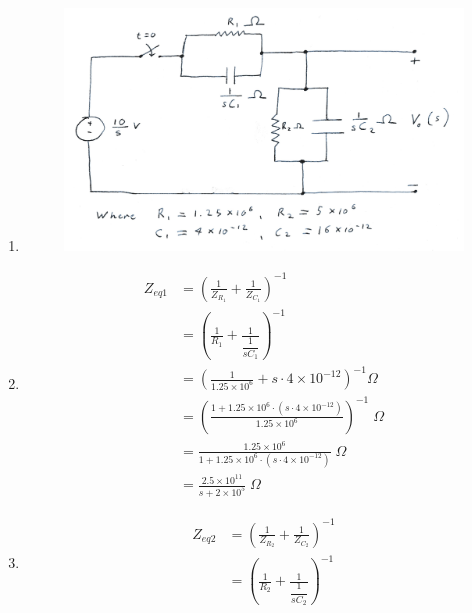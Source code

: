 \def \sx {12500}
\def \sy {200000}
\def \sz {3.125\times 10^{10}}
\def \sw {50000}

\def \sa {\dfrac{13}{2500000}}
\def \sb {\dfrac{2}{25}}
\def \sc {50000}

\begin{enumerate}
	\item{
	\text{ }
		\begin{figure}[H]
		\begin{center}
		\includegraphics[scale=0.75]{1a.JPG}
		\end{center}
		\end{figure}
	}
	\item{
		\begin{align*}
		Z_{eq1} &= \left( \frac{1}{Z_{R_1}} +								%
		\frac{1}{Z_{C_1}} \right)^{-1}\\
		&= \left( \frac{1}{R_1} + \frac{1}{\dfrac{1}{sC_1} } \right)^{-1}\\
		&= \left(\frac{1}{1.25 \times 10^6} + 								%
		s \cdot 4 \times 10^{-12}\right)^{-1} \Omega\\
		&= \left(\frac{1 + 1.25\times 10^6 \cdot (s \cdot 4 \times 10^{-12})%
		}{ 1.25\times 10^6} \right)^{-1} \; \Omega\\
		&= \frac{1.25\times 10^6}{1 + 1.25\times 10^6 						%
		\cdot (s \cdot 4 \times 10^{-12})} \; \Omega\\
		&= \frac{2.5 \times 10^{11}}{s + 2 \times 10^5} \; \Omega
		\end{align*}
	}
	\item{
		\begin{align*}
		Z_{eq2} &= \left( \frac{1}{Z_{R_2}} +								%
		\frac{1}{Z_{C_2}} \right)^{-1}\\
		&= \left( \frac{1}{R_2} + \frac{1}{\dfrac{1}{sC_2} } \right)^{-1}\\

\end{align*}}
\end{enumerate}
